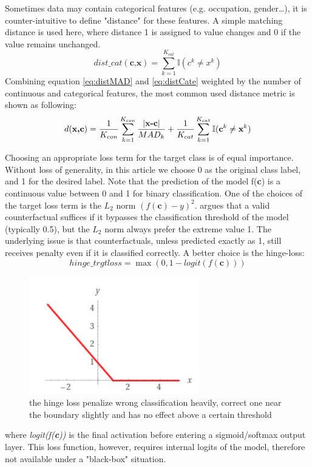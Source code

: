 Sometimes data may contain categorical features (e.g. occupation, gender\dots), it is counter-intuitive to define "distance" for these features. A simple matching distance is used here, where distance 1 is assigned to value changes and 0 if the value remains unchanged.
\begin{equation}\label{eq:distCate}
  dist\_cat(\textbf{c,x})=\sum_{k=1}^{K_{cat}}\mathbb{I}(c^k\neq x^k)
\end{equation}
Combining equation \ref{eq:distMAD} and \ref{eq:distCate} weighted by the number of continuous and categorical features, the most common used distance metric is shown as following:
\begin{equation}\label{distCombined}
  d(\textbf{x,c})=\frac{1}{K_{con}}\sum_{k=1}^{K_{con}}\frac{|\textbf{x-c}|}{MAD_k}
  +\frac{1}{K_{cat}}\sum_{k=1}^{K_{cat}}\mathbb{I}(\textbf c^k
  \neq \textbf x^k)
\end{equation}

Choosing an appropriate loss term for the target class is of equal importance. Without loss of generality, in this article we choose 0 as the original class label, and 1 for the desired label. Note that the prediction of the model f(\textbf{c}) is a continuous value between 0 and 1 for binary classification. One of the choices of the target loss term is the \emph{$L_2$} norm $(f(\textbf{c})-y)^2$. \cite{DiCE} argues that a valid counterfactual suffices if it bypasses the classification threshold of the model (typically 0.5), but the \emph{$L_2$} norm always prefer the extreme value 1. The underlying issue is that counterfactuals, unless predicted exactly as 1, still receives penalty even if it is classified correctly. A better choice is the hinge-loss:
\begin{equation}\label{eq:hingeloss}
  hinge\_trgtloss=\max(0,1-logit(f(\textbf{c})))
\end{equation}
\begin{figure}
  \centering
  \includegraphics[]{hingeloss.PNG}
  \caption{the hinge loss penalize wrong classification heavily, correct one near the boundary slightly and has no effect above a certain threshold}\label{fig:hingeloss}
\end{figure}
where \emph{logit(f(\textbf{c}))} is the final activation before entering a sigmoid/softmax output layer. This loss function, however, requires internal logits of the model, therefore not available under a "black-box" situation.

